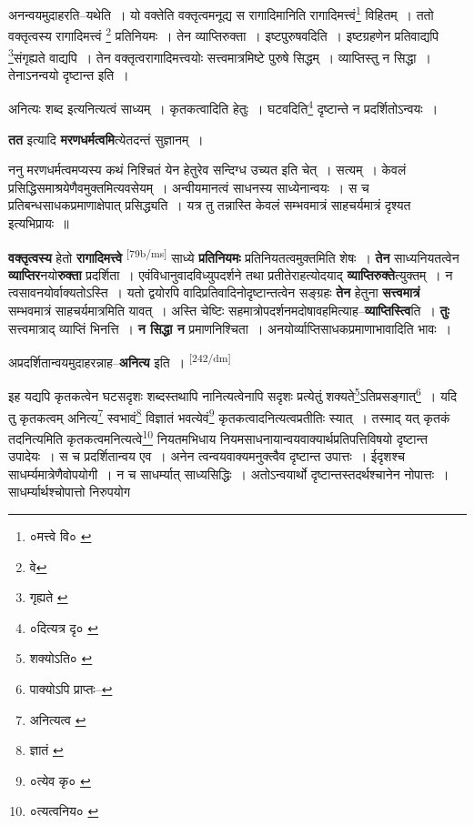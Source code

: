 \documentclass[article,12pt,a4paper]{memoir}
\begin{document}
	  \pstart अनन्वयमुदाहरति--यथेति । यो वक्तेति वक्तृत्वमनूद्य स रागादिमानिति रागादिमत्त्वं\footnote{०मत्त्वे वि० \cite{dp-msA}} विहितम् । ततो वक्तृत्वस्य रागादिमत्त्वं \footnote{वे} प्रतिनियमः । तेन व्याप्तिरुक्ता । इष्टपुरुषवदिति । इष्टग्रहणेन प्रतिवाद्यपि \footnote{गृह्यते \cite{dp-msA} \cite{dp-edP} \cite{dp-edH} \cite{dp-edE} \cite{dp-edN}}संगृह्यते वाद्यपि । तेन वक्तृत्वरागादिमत्त्वयोः सत्त्वमात्रमिष्टे पुरुषे सिद्धम् । व्याप्तिस्तु न सिद्धा । तेनाऽनन्वयो दृष्टान्त इति ।
	\pend
       

	  \pstart अनित्यः शब्द इत्यनित्यत्वं साध्यम् । कृतकत्वादिति हेतुः । घटवदिति\footnote{०दित्यत्र दृ० \cite{dp-msA} \cite{dp-edP} \cite{dp-edH} \cite{dp-edE}} दृष्टान्ते न प्रदर्शितोऽन्वयः ।
	\pend
      

	  \pstart \textbf{तत} इत्यादि \textbf{मरणधर्मत्वमि}त्येतदन्तं सुज्ञानम् ।
	\pend
      

	  \pstart ननु मरणधर्मत्वमप्यस्य कथं निश्चितं येन हेतुरेव सन्दिग्ध उच्यत इति चेत् । सत्यम् । केवलं प्रसिद्धिसमाश्रयेणैवमुक्तमित्यवसेयम् । अन्वीयमानत्वं साधनस्य साध्येनान्वयः । स च प्रतिबन्धसाधकप्रमाणाक्षेपात् प्रसिद्ध्यति । यत्र तु तन्नास्ति केवलं सम्भवमात्रं साहचर्यमात्रं दृश्यत इत्यभिप्रायः ॥
	\pend
      

	  \pstart \textbf{वक्तृत्वस्य} हेतो \textbf{रागादिमत्त्वे} \leavevmode\textsuperscript{\rmlatinfont\tiny [79b/ms]} साध्ये \textbf{प्रतिनियमः} प्रतिनियतत्वमुक्तमिति शेषः । \textbf{तेन} साध्यनियतत्वेन \textbf{व्याप्तिर}नयो\textbf{रुक्ता} प्रदर्शिता । एवंविधानुवादविध्युपदर्शने तथा प्रतीतेराहत्योदयाद् \textbf{व्याप्तिरुक्ते}त्युक्तम् । न त्वसावनयोर्वाक्यतोऽस्ति । यतो द्वयोरपि वादिप्रतिवादिनोदृष्टान्तत्वेन सङ्ग्रहः \textbf{तेन} हेतुना \textbf{सत्त्वमात्रं} सम्भवमात्रं साहचर्यमात्रमिति यावत् । अस्ति चेष्टिः सहमात्रोपदर्शनमदोषावहमित्याह--\textbf{व्याप्तिस्त्वि}ति । \textbf{तुः} सत्त्वमात्राद् व्याप्तिं भिनत्ति । \textbf{न सिद्धा न} प्रमाणनिश्चिता । अनयोर्व्याप्तिसाधकप्रमाणाभावादिति भावः ।
	\pend
      

	  \pstart अप्रदर्शितान्वयमुदाहरन्नाह--\textbf{अनित्य} इति ।
	\pend
      \leavevmode\textsuperscript{\rmlatinfont\tiny [242/dm]}

	  \pstart इह यद्यपि कृतकत्वेन घटसदृशः शब्दस्तथापि नानित्यत्वेनापि सदृशः प्रत्येतुं शक्यते\footnote{शक्योऽति० \cite{dp-msA} \cite{dp-edP} \cite{dp-edH} \cite{dp-edE} \cite{dp-edN}}ऽतिप्रसङ्गात्\footnote{पाक्योऽपि प्राप्तः--\cite{dp-msD-n}} । यदि तु कृतकत्वम् अनित्य\footnote{अनित्यत्व \cite{dp-msA} \cite{dp-msC} \cite{dp-edP} \cite{dp-edH} \cite{dp-edE} \cite{dp-edN}} स्वभावं\footnote{ज्ञातं \cite{dp-msC}} विज्ञातं भवत्येवं\footnote{०त्येव कृ० \cite{dp-msC}} कृतकत्वादनित्यत्वप्रतीतिः स्यात् । तस्माद् यत् कृतकं तदनित्यमिति कृतकत्वमनित्यत्वे\footnote{०त्यत्वनिय० \cite{dp-msA} \cite{dp-edP} \cite{dp-edH} \cite{dp-edE} \cite{dp-edN}} नियतमभिधाय नियमसाधनायान्वयवाक्यार्थप्रतिपत्तिविषयो दृष्टान्त उपादेयः । स च प्रदर्शितान्वय एव । अनेन त्वन्वयवाक्यमनुक्त्वैव दृष्टान्त उपात्तः । ईदृशश्च साधर्म्यमात्रेणैवोपयोगी । न च साधर्म्यात् साध्यसिद्धिः । अतोऽन्वयार्थो दृष्टान्तस्तदर्थश्चानेन नोपात्तः । साधर्म्यार्थश्चोपात्तो निरुपयोग
	\pend
      
\end{document}
